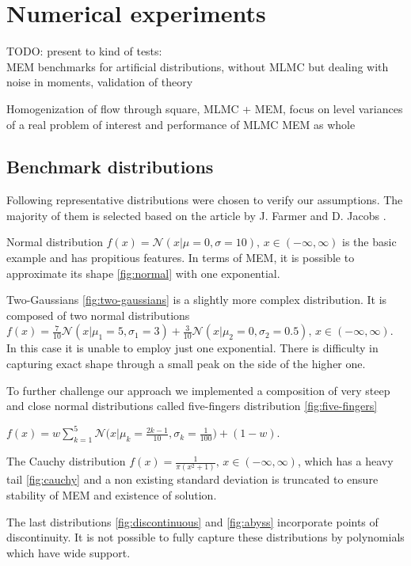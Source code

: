 \documentclass{article}
\newcommand{\jb}[1]{{\color{violet}#1}}  %
\begin{document}
\section{Numerical experiments}
\jb{TODO: present to kind of tests: \\

MEM benchmarks for artificial distributions, without MLMC but dealing with noise in moments, validation of theory

Homogenization of flow through square, MLMC + MEM, focus on level variances of a real problem of interest and performance of MLMC MEM as whole}

\subsection{Benchmark distributions}

Following representative distributions were chosen to verify our assumptions. The majority of them is selected based on the article by J. Farmer and D. Jacobs \cite{Farmer2018511}.

Normal distribution $f(x) = \mathcal{N}(x|\mu=0, \sigma=10) \text{, } x \in (-\infty, \infty)$ is the basic example and has propitious features. In terms of MEM, it is possible to approximate its shape \ref{fig:normal} with one exponential. 

Two-Gaussians \ref{fig:two-gaussians} is a slightly more complex distribution. It is composed of two normal distributions $ f(x) = \frac{7}{10} \mathcal{N}(x|\mu_{1}=5, \sigma_{1}=3) + \frac{3}{10}\mathcal{N}(x|\mu_{2}=0, \sigma_{2}=0.5) \text{, } x \in (-\infty, \infty) \text{.}$ In this case it is unable to employ just one exponential. There is difficulty in capturing exact shape through a small peak on the side of the higher one.


To further challenge our approach we implemented a composition of very steep and close normal distributions called five-fingers distribution \ref{fig:five-fingers}

$ f(x) = w \sum_{k=1}^{5}{\mathcal{N}\bigg(x\bigg|\mu_{k}=\frac{2k-1}{10}, \sigma_{k} = \frac{1}{100}\bigg)} + (1-w) \text{.}$ 


The Cauchy distribution $f(x) = \frac{1}{\pi(x^2 + 1)} \text{, } x \in (-\infty, \infty)$, which has a heavy tail \ref{fig:cauchy} and a non existing standard deviation is truncated to ensure stability of MEM and existence of solution.

The last distributions \ref{fig:discontinuous} and \ref{fig:abyss} incorporate points of discontinuity. It is not possible to fully capture these distributions by polynomials which have wide support. 
\end{document}
